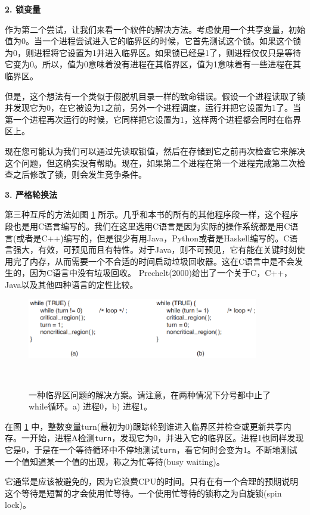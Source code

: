 	\textbf{2. 锁变量}
	
	作为第二个尝试，让我们来看一个软件的解决方法。考虑使用一个共享变量，初始值为0。当一个进程尝试进入它的临界区的时候，它首先测试这个锁。如果这个锁为0，则进程将它设置为1并进入临界区。如果锁已经是1了，则进程仅仅只是等待它变为0。所以，值为0意味着没有进程在其临界区，值为1意味着有一些进程在其临界区。
	
	但是，这个想法有一个类似于假脱机目录一样的致命错误。假设一个进程读取了锁并发现它为0，在它被设为1之前，另外一个进程调度，运行并把它设置为1了。当第一个进程再次运行的时候，它同样把它设置为1，这样两个进程都会同时在临界区上。
	
	现在您可能认为我们可以通过先读取锁值，然后在存储到它之前再次检查它来解决这个问题，但这确实没有帮助。现在，如果第二个进程在第一个进程完成第二次检查之后修改了锁，则会发生竞争条件。
	
	\textbf{3. 严格轮换法}
	
	第三种互斥的方法如图 \ref{fig:strictalternation} 所示。几乎和本书的所有的其他程序段一样，这个程序段也是用C语言编写的。我们在这里选用C语言是因为实际的操作系统都是用C语言(或者是C++)编写的，但是很少有用Java，Python或者是Haskell编写的。C语言强大，有效，可预见而且有特性。对于Java，则不可预见，它有能在关键时刻使用完了内存，从而需要一个不合适的时间启动垃圾回收器。这在C语言中是不会发生的，因为C语言中没有垃圾回收。 Prechelt(2000)给出了一个关于C，C++，Java以及其他四种语言的定性比较。
	
	\begin{figure}[ht]\small
		\centering
		\includegraphics[width=0.90\textwidth]{FIG/2-23.png}
		\caption{一种临界区问题的解决方案。请注意，在两种情况下分号都中止了while循环。a) 进程0，b) 进程1。}　\label{fig:strictalternation}
	\end{figure}
	
	在图 \ref{fig:strictalternation} 中，整数变量turn(最初为0)跟踪轮到谁进入临界区并检查或更新共享内存。一开始，进程A检测\texttt{turn}，发现它为0，并进入它的临界区。进程1也同样发现它是0，于是在一个等待循环中不停地测试\texttt{turn}，看它何时会变为1。不断地测试一个值知道某一个值的出现，称之为忙等待(busy waiting)。
	
	它通常是应该被避免的，因为它浪费CPU的时间。只有在有一个合理的预期说明这个等待是短暂的才会使用忙等待。一个使用忙等待的锁称之为自旋锁(spin lock)。
	
